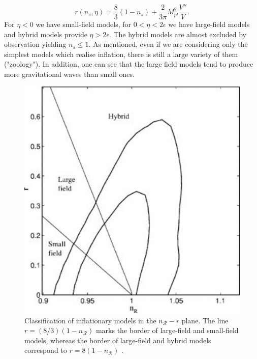 \documentclass[11pt,a4paper,twoside]{book}
\begin{document}
\begin{equation}
	r(n_{s},\eta)=\frac{8}{3}(1-n_{s}) + \frac{2}{3\pi}M_{pl}^{2}\frac{V''}{V}.
\end{equation}
For $\eta < 0 $ we have small-field models, for $ 0<\eta<2\epsilon $ we have  large-field models and hybrid models provide $\eta>2\epsilon $. The hybrid models are almost excluded by observation yielding $ n_{s} \le 1 $.
As mentioned, even if we are considering only the simplest models which realise inflation, there is still a large variety of them ("zoology"). In addition, one can see that the large field models tend to produce more gravitational waves than small ones.
\begin{figure}
	\centering
	\includegraphics[width=0.6\linewidth, height=0.3\textheight]{Images/Chap2/r_ns_InflDynamicsAndReheating}
	\caption{Classification of inflationary models in the $ n_{\mathcal{R}}-r $ plane. The line $ r = (8/3)(1-n_{\mathcal{R}}) $ marks the border of large-field and small-field models,  whereas  the border of large-field and hybrid models correspond to $ r=8(1-n_\mathcal{R}) $ \cite{InflationDynamicsAndReheating:chap1}.}
	\label{fig:rnsinfldynamicsandreheating}
\end{figure}
\end{document}
